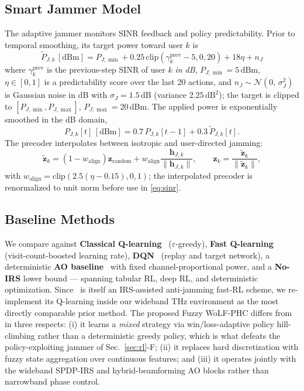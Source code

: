 \documentclass[10pt,conference]{IEEEtran}
\newcommand{\vect}[1]{\mathbf{#1}}
\begin{document}
\subsection{Smart Jammer Model}

The adaptive jammer monitors SINR feedback and policy predictability. Prior to temporal smoothing, its target power toward user $k$ is
\begin{equation}
\tilde{P}_{J,k}\,[\text{dBm}] = P_{J,\min} + 0.25\,\text{clip}(\gamma_k^{\text{prev}} - 5, 0, 20) + 18\eta + n_J
\label{eq:jammer_power}
\end{equation}
where $\gamma_k^{\text{prev}}$ is the previous-step SINR of user $k$ \emph{in dB}, $P_{J,\min}=5\,\text{dBm}$, $\eta \in [0,1]$ is a predictability score over the last 20 actions, and $n_J \sim \mathcal{N}(0,\,\sigma_J^2)$ is Gaussian noise in dB with $\sigma_J = 1.5$\,dB (variance $2.25\,\text{dB}^2$); the target is clipped to $[P_{J,\min}, P_{J,\max}]$, $P_{J,\max}=20$\,dBm. The applied power is exponentially smoothed in the dB domain,
\begin{equation}
P_{J,k}[t]\,[\text{dBm}] = 0.7\,P_{J,k}[t-1] + 0.3\,\tilde{P}_{J,k}[t].
\label{eq:jammer_smooth}
\end{equation}
The precoder interpolates between isotropic and user-directed jamming:
\begin{equation}
\tilde{\vect{z}}_k = (1 - w_{\text{align}})\vect{z}_{\text{random}} + w_{\text{align}}\frac{\vect{h}_{J,k}}{\|\vect{h}_{J,k}\|},
\qquad
\vect{z}_k = \frac{\tilde{\vect{z}}_k}{\|\tilde{\vect{z}}_k\|},
\end{equation}
with $w_{\text{align}} = \text{clip}(2.5(\eta - 0.15), 0, 1)$; the interpolated precoder is renormalized to unit norm before use in \eqref{eq:sinr}.

\subsection{Baseline Methods}

We compare against \textbf{Classical Q-learning}~\cite{watkins1992q} ($\varepsilon$-greedy), \textbf{Fast Q-learning}~\cite{yang2021irs} (visit-count-boosted learning rate), \textbf{DQN}~\cite{mnih2015human} (replay and target network), a deterministic \textbf{AO baseline}~\cite{wu2019intelligent} with fixed channel-proportional power, and a \textbf{No-IRS} lower bound --- spanning tabular RL, deep RL, and deterministic optimization. Since~\cite{yang2021irs} is itself an IRS-assisted anti-jamming fast-RL scheme, we re-implement its Q-learning inside our wideband THz environment as the most directly comparable prior method. The proposed Fuzzy WoLF-PHC differs from~\cite{yang2021irs} in three respects: (i) it learns a \emph{mixed} strategy via win/loss-adaptive policy hill-climbing rather than a deterministic greedy policy, which is what defeats the policy-exploiting jammer of Sec.~\ref{sec:rl}-F; (ii) it replaces hard discretization with fuzzy state aggregation over continuous features; and (iii) it operates jointly with the wideband SPDP-IRS and hybrid-beamforming AO blocks rather than narrowband phase control.
\end{document}
